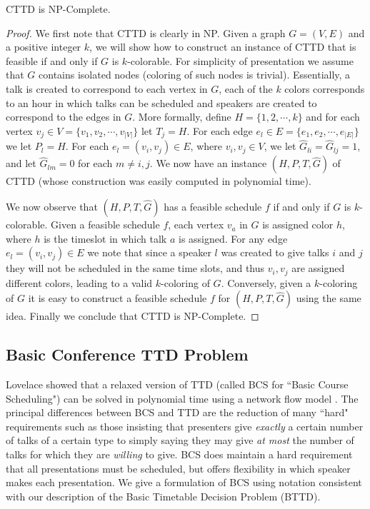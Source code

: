 \documentclass{svjour3}                     %
\begin{document}
\begin{proposition}\label{cttd_np}
	CTTD is NP-Complete.
\end{proposition}
\begin{proof}
We first note that CTTD is clearly in NP.  
Given a graph $G=(V,E)$ and a positive integer $k$, we will show how to construct an instance of CTTD that is feasible if and only if $G$ is $k$-colorable.
For simplicity of presentation we assume that $G$ contains isolated nodes (coloring of such nodes is trivial).
Essentially, a talk is created to correspond to each vertex in $G$, each of the $k$ colors corresponds to an hour in which talks can be scheduled and speakers are created to correspond to the edges in $G$.
More formally, define $H=\{1, 2, \cdots, k\}$ and for each vertex $v_j \in V=\{v_1, v_2, \cdots, v_{|V|}\}$ let $T_j = H$. 
For each edge $e_l \in E=\{e_1, e_2, \cdots, e_{|E|}\}$ we let $P_l = H$. 
For each $e_l = (v_i,v_j)\in E$, where $v_i,v_j \in V$, we let $\hat G_{li} = \hat G_{lj} = 1$, and let $\hat G_{lm}=0$ for each $m\neq i,j$. 
We now have an instance $(H, P, T, \hat G)$ of CTTD (whose construction was easily computed in polynomial time). 

We now observe that $(H, P, T, \hat G)$ has a feasible schedule $f$ if and only if $G$ is $k$-colorable.
Given a feasible schedule $f$, each vertex $v_a$ in $G$ is assigned color $h$, where $h$ is the timeslot in which talk $a$ is assigned.
For any edge $e_l=(v_i,v_j)\in E$ we note that since a speaker $l$ was created to give talks $i$ and $j$ they will not be scheduled in the same time slots, and thus $v_i,v_j$ are assigned different colors, leading to a valid $k$-coloring of $G$.
Conversely, given a $k$-coloring of $G$ it is easy to construct a feasible schedule $f$ for $(H, P, T, \hat G)$ using the same idea.
Finally we conclude that CTTD is NP-Complete.
\end{proof}


\subsection{Basic Conference TTD Problem}
Lovelace showed that a relaxed version of TTD (called BCS for ``Basic Course Scheduling") can be solved in polynomial time using a network flow model \cite{lovelace2010}. 
The principal differences between BCS and TTD are the reduction of many ``hard" requirements such as those insisting that presenters give \emph{exactly} a certain number of talks of a certain type to simply saying they may give \emph{at most} the number of talks for which they are \emph{willing} to give. 
BCS does maintain a hard requirement that all presentations must be scheduled, but offers flexibility in which speaker makes each presentation.
We give a formulation of BCS using notation consistent with our description of the Basic Timetable Decision Problem (BTTD).
\end{document}
